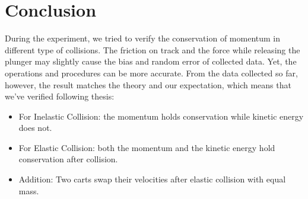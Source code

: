 \documentclass[12pt]{article}
\begin{document}
	\section{Conclusion}
	During the experiment, we tried to verify the conservation of momentum in different type of collisions. The friction on track and the force while releasing the plunger may slightly cause the bias and random error of collected data. Yet, the operations and procedures can be more accurate. From the data collected so far, however, the result matches the theory and our expectation, which means that we've verified following thesis:
	\begin{itemize}
		\item For Inelastic Collision: the momentum holds conservation while kinetic energy does not.
		\item For Elastic Collision: both the momentum and the kinetic energy hold conservation after collision. 
		\item Addition: Two carts swap their velocities after elastic collision with equal mass.
	\end{itemize}
	
\end{document}

